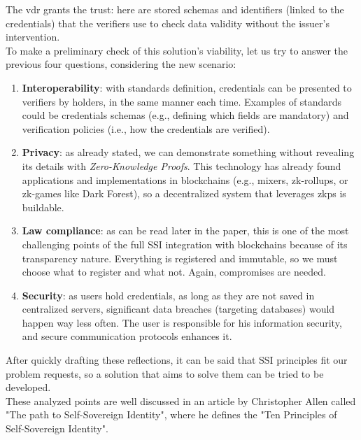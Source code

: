 The \acrfull{vdr} grants the trust: here are stored schemas and 
identifiers (linked to the credentials) that the verifiers use to check 
data validity without the issuer's intervention.
\vspace*{0.3cm}\\
To make a preliminary check of this solution's viability, let us try to 
answer the previous four questions, considering the new scenario:
\begin{enumerate}
    \item \textbf{Interoperability}: with standards definition, credentials
    can be presented to verifiers by holders, in the same manner each time. 
    Examples of standards could be credentials schemas (e.g., defining which fields are 
    mandatory) and verification policies (i.e., how the credentials are verified).
    \item \textbf{Privacy}: as already stated, we can demonstrate something
    without revealing its details with \textit{Zero-Knowledge Proofs}. This 
    technology has already found applications and implementations in 
    blockchains (e.g., mixers\cite{site:mixers}, zk-rollups\cite{site:zkrollups}, 
    or zk-games like Dark Forest\cite{site:darkforest}), 
    so a decentralized system that leverages \acrshort{zkp}s is buildable.
    \item \textbf{Law compliance}: as can be read later in the paper, 
    this is one of the most challenging points of the full SSI integration 
    with blockchains because of its transparency nature. Everything is 
    registered and immutable, so we must choose what to register and what 
    not. Again, compromises are needed.
    \item \textbf{Security}: as users hold credentials, as long as they are
    not saved in centralized servers, significant data breaches (targeting 
    databases) would happen way less often. The user is responsible for his 
    information security, and secure communication protocols enhances it.
\end{enumerate}
After quickly drafting these reflections, it can be said that SSI 
principles fit our problem requests, so a solution that aims to solve them 
can be tried to be developed.\\
These analyzed points are well discussed in an article by Christopher Allen 
called "The path to Self-Sovereign Identity", where he defines the "Ten 
Principles of Self-Sovereign Identity"\cite{site:ssiprinciples}.

